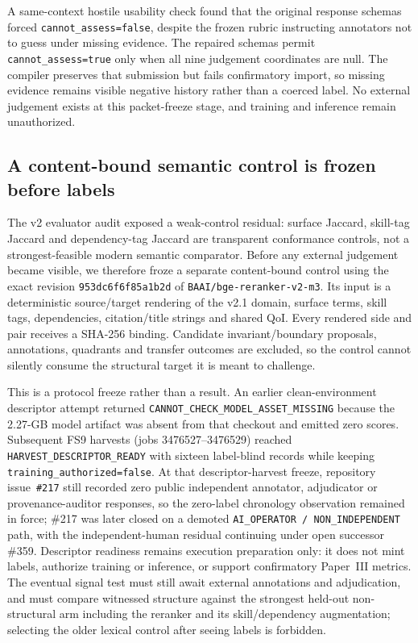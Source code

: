 A same-context hostile usability check found that the original response schemas forced \texttt{cannot\_assess=false}, despite the frozen rubric instructing annotators not to guess under missing evidence. The repaired schemas permit \texttt{cannot\_assess=true} only when all nine judgement coordinates are null. The compiler preserves that submission but fails confirmatory import, so missing evidence remains visible negative history rather than a coerced label. No external judgement exists at this packet-freeze stage, and training and inference remain unauthorized.

\subsection{A content-bound semantic control is frozen before labels}

The v2 evaluator audit exposed a weak-control residual: surface Jaccard, skill-tag Jaccard and dependency-tag Jaccard are transparent conformance controls, not a strongest-feasible modern semantic comparator.  Before any external judgement became visible, we therefore froze a separate content-bound control using the exact revision \texttt{953dc6f6f85a1b2d} of \texttt{BAAI/bge-reranker-v2-m3}.  Its input is a deterministic source/target rendering of the v2.1 domain, surface terms, skill tags, dependencies, citation/title strings and shared QoI.  Every rendered side and pair receives a SHA-256 binding.  Candidate invariant/boundary proposals, annotations, quadrants and transfer outcomes are excluded, so the control cannot silently consume the structural target it is meant to challenge.

\begin{sloppypar}
This is a protocol freeze rather than a result.  An earlier clean-environment descriptor attempt returned \texttt{CANNOT\_CHECK\_MODEL\_ASSET\_MISSING} because the 2.27-GB model artifact was absent from that checkout and emitted zero scores.  Subsequent FS9 harvests (jobs 3476527--3476529) reached \texttt{HARVEST\_DESCRIPTOR\_READY} with sixteen label-blind records while keeping \texttt{training\_authorized=false}.  At that descriptor-harvest freeze, repository issue~\texttt{\#217} still recorded zero public independent annotator, adjudicator or provenance-auditor responses, so the zero-label chronology observation remained in force; \#217 was later closed on a demoted \texttt{AI\_OPERATOR / NON\_INDEPENDENT} path, with the independent-human residual continuing under open successor \#359.  Descriptor readiness remains execution preparation only: it does not mint labels, authorize training or inference, or support confirmatory Paper~III metrics.  The eventual signal test must still await external annotations and adjudication, and must compare witnessed structure against the strongest held-out non-structural arm including the reranker and its skill/dependency augmentation; selecting the older lexical control after seeing labels is forbidden.
\end{sloppypar}
